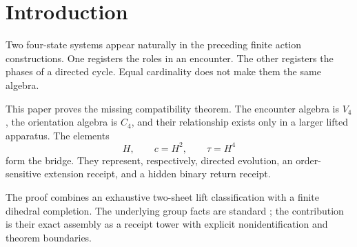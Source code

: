 \section{Introduction}

Two four-state systems appear naturally in the preceding finite
action constructions. One registers the roles in an encounter. The
other registers the phases of a directed cycle. Equal cardinality does
not make them the same algebra.

This paper proves the missing compatibility theorem. The encounter
algebra is \(V_4\), the orientation algebra is \(C_4\), and their
relationship exists only in a larger lifted apparatus. The elements
\[
H,\qquad c=H^2,\qquad \tau=H^4
\]
form the bridge. They represent, respectively, directed evolution, an
order-sensitive extension receipt, and a hidden binary return receipt.

The proof combines an exhaustive two-sheet lift classification with a
finite dihedral completion. The underlying group facts are standard
\cite{dummit-foote,rotman}; the contribution is their exact assembly
as a receipt tower with explicit nonidentification and theorem
boundaries.

